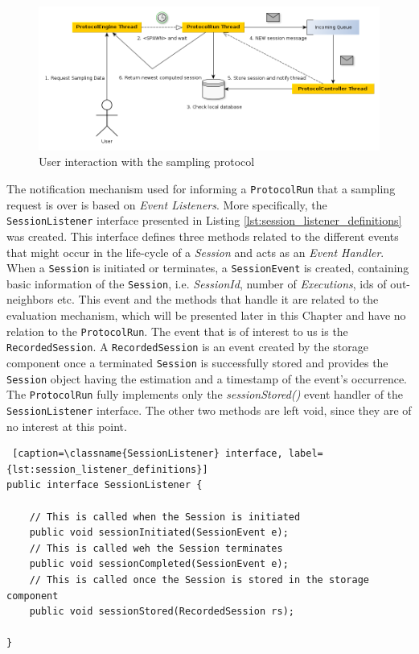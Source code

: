 \documentclass[a4paper,11pt,twoside]{report}
\newcommand{\classname}[1]{\texttt{#1}}
\begin{document}
\begin{figure}
   \centering
    \includegraphics[scale=0.5]{../figures/user_interaction.png}
     \caption{User interaction with the sampling protocol}
     \label{fig:unser_interaction}
\end{figure}

The notification mechanism used for informing a \classname{ProtocolRun} that a sampling request is over is based on \textit{Event Listeners}. More specifically, the \classname{SessionListener} interface presented in Listing \ref{lst:session_listener_definitions} was created. This interface defines three methods related to the different events that might occur in the life-cycle of a \textit{Session} and acts as an \textit{Event Handler}. When a \classname{Session} is initiated or terminates, a \classname{SessionEvent} is created, containing basic information of the \classname{Session}, i.e. \textit{SessionId}, number of \textit{Executions}, ids of out-neighbors etc. This event and the methods that handle it are related to the evaluation mechanism, which will be presented later in this Chapter and have no relation to the \classname{ProtocolRun}. The event that is of interest to us is the \classname{RecordedSession}. A \classname{RecordedSession} is an event created by the storage component once a terminated \classname{Session} is successfully stored and provides the \classname{Session} object having the estimation and a timestamp of the event's occurrence. The \classname{ProtocolRun} fully implements only the \textit{sessionStored()} event handler of the \classname{SessionListener} interface. The other two methods are left void, since they are of no interest at this point.\\

\begin{lstlisting} [caption=\classname{SessionListener} interface, label={lst:session_listener_definitions}]
public interface SessionListener {

	// This is called when the Session is initiated
	public void sessionInitiated(SessionEvent e);
	// This is called weh the Session terminates
	public void sessionCompleted(SessionEvent e);
	// This is called once the Session is stored in the storage component
	public void sessionStored(RecordedSession rs);
	
}
\end{lstlisting}
\end{document}
